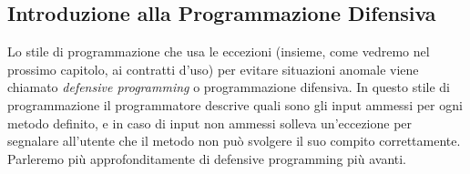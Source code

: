 \subsection{Introduzione alla Programmazione Difensiva}
Lo stile di programmazione che usa le eccezioni (insieme, come vedremo nel prossimo capitolo, ai contratti d'uso) per evitare situazioni anomale viene chiamato \emph{defensive programming} o programmazione difensiva. In questo stile di programmazione il programmatore descrive quali sono gli input ammessi per ogni metodo definito, e in caso di input non ammessi solleva un'eccezione per segnalare all'utente che il metodo non può svolgere il suo compito correttamente. Parleremo più approfonditamente di defensive programming più avanti.

